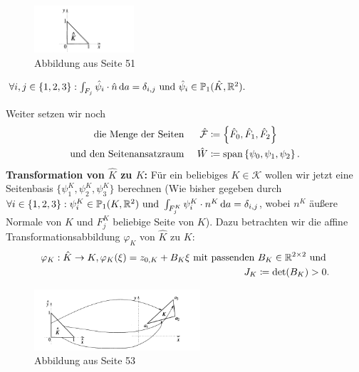 \begin{figure}[H]
	\centering
	\includegraphics[width=0.33\textwidth]{referenzzelle.png} \\
	Abbildung aus \cite{knabner2013numerik} Seite 51
\end{figure}

\begin{Bemerkung}
	$\forall i,j\in\{1,2,3\}: \int_{F_j} \hat{\psi}_i \cdot \hat{n} \, \mathrm{d} a = \delta_{i,j} \text{ und } \hat{\psi}_i \in \mathbb{P}_1(\hat{K}, \mathbb{R}^2).$
\end{Bemerkung}

Weiter setzen wir noch 
\begin{align*}
\text{ die Menge der Seiten }&& \hat{\mathcal{F}} &\coloneqq \left\{ \hat{F}_0, \hat{F}_1, \hat{F}_2 \right\} \\
\text{und den Seitenansatzraum }&&  \hat{W} &\coloneqq \operatorname{span} \left\{ \psi_0,\psi_1, \psi_2 \right\}.
\end{align*}
\textbf{Transformation von $ \hat{K} $ zu $ K $:} Für ein beliebiges $ K \in \mathcal{K} $ wollen wir jetzt eine Seitenbasis $ \{ \psi_1^K, \psi_2^K, \psi_3^K \} $ berechnen (Wie bisher gegeben durch $ \forall i\in\{1,2,3\}: \psi_i^K\in\mathbb{P}_1(K,\mathbb{R}^2) \text{ und } \int_{F_j^K} \psi_i^K \cdot n^K \, \mathrm{d} a = \delta_{i,j} $, wobei $ n^K $ äußere Normale von  $ K $ und $ F_j^K  $ beliebige Seite von $ K $). Dazu betrachten wir die affine Transformationsabbildung $ \varphi_K $ von $ \hat{K} $ zu $ K $:
\begin{align*}
\varphi_K: \hat{K} \to K, \varphi_K(\xi) = z_{0,K} + B_K \xi \text{ mit passenden } B_K\in\mathbb{R}^{2 \times 2} \text{ und } \\
J_K \coloneqq \det(B_K) > 0.
\end{align*}

\begin{figure}[H]
	\centering
	\includegraphics[width=0.55\textwidth]{affinlinearetransf.png} \\
	Abbildung aus \cite{knabner2013numerik} Seite 53
\end{figure} 

